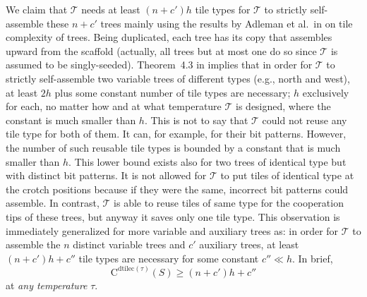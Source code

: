 \documentclass{article}
\theoremstyle{remark}
\theoremstyle{definition}
\newcommand{\tas}{\ensuremath{\mathcal{T}}}
\newcommand{\dtilec}[1]{\ensuremath{\mathrm{C}^{\mathrm{dtilec}(#1)}}}
\begin{document}
We claim that $\tas$ needs at least $(n+c')h$ tile types for $\tas$ to strictly self-assemble these $n+c'$ trees mainly using the results by Adleman et al.~in \cite{AdChGoHuKeEsRo2002} on tile complexity of trees. 
Being duplicated, each tree has its copy that assembles upward from the scaffold (actually, all trees but at most one do so since $\tas$ is assumed to be singly-seeded). 
Theorem~4.3 in \cite{AdChGoHuKeEsRo2002} implies that in order for $\tas$ to strictly self-assemble two variable trees of different types (e.g., north and west), at least $2h$ plus some constant number of tile types are necessary; $h$ exclusively for each, no matter how and at what temperature $\tas$ is designed, where the constant is much smaller than $h$. 
This is not to say that $\tas$ could not reuse any tile type for both of them. 
It can, for example, for their bit patterns. 
However, the number of such reusable tile types is bounded by a constant that is much smaller than $h$. 
This lower bound exists also for two trees of identical type but with distinct bit patterns. 
It is not allowed for $\tas$ to put tiles of identical type at the crotch positions because if they were the same, incorrect bit patterns could assemble.
In contrast, $\tas$ is able to reuse tiles of same type for the cooperation tips of these trees, but anyway it saves only one tile type. 
This observation is immediately generalized for more variable and auxiliary trees as: in order for $\tas$ to assemble the $n$ distinct variable trees and $c'$ auxiliary trees, at least $(n+c')h + c''$ tile types are necessary for some constant $c'' \ll h$. 
In brief, 
\[
	\dtilec{\tau}(S) \ge (n+c')h + c''
\]
at {\it any temperature} $\tau$. 
\end{document}
